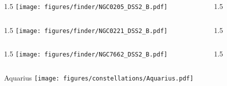 \documentclass[final]{beamer}
\newlength{\colwidth}
\begin{document}
\begin{frame}[t]{}
    \begin{columns}[T]
        \begin{column}{1.5\colwidth}
            \centering
            \texttt{[image: figures/finder/NGC0205\_DSS2\_B.pdf]}
        \end{column}
        \begin{column}{1.5\colwidth}
            \Large
            
        \end{column}
    \end{columns}
    \vspace{\fill}
    \begin{columns}[T]
        \begin{column}{1.5\colwidth}
            \centering
            \texttt{[image: figures/finder/NGC0221\_DSS2\_B.pdf]}
        \end{column}
        \begin{column}{1.5\colwidth}
            \Large
            
        \end{column}
    \end{columns}
\end{frame}


\begin{frame}[t]{}
    \begin{columns}[T]
        \begin{column}{1.5\colwidth}
            \centering
            \texttt{[image: figures/finder/NGC7662\_DSS2\_B.pdf]}
        \end{column}
        \begin{column}{1.5\colwidth}
            \Large
            
        \end{column}
    \end{columns}
    \vspace{\fill}
\end{frame}


\begin{frame}[t]{\LARGE Aquarius}
    \centering
    \texttt{[image: figures/constellations/Aquarius.pdf]}
\end{frame}
\end{document}
